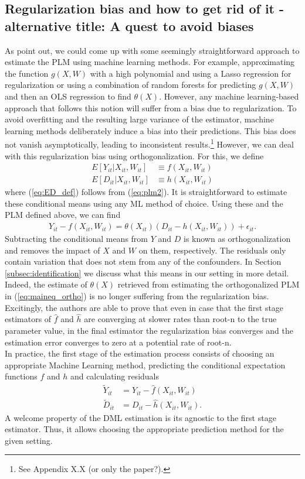 \subsection{Regularization bias and how to get rid of it - alternative title: A quest to avoid biases}
As \cite{DML2017} point out, we could come up with some seemingly straightforward approach to estimate the PLM using machine learning methods. For example, approximating the function $g(X, W)$ with a high polynomial and using a Lasso regression for regularization or using a combination of random forests for predicting $g(X, W)$ and then an OLS regression to find $\theta(X)$. However, any machine learning-based approach that follows this notion will suffer from a bias due to regularization. To avoid overfitting and the resulting large variance of the estimator, machine learning methods deliberately induce a bias into their predictions. This bias does not vanish asymptotically, leading to inconsistent results.\footnote{See Appendix X.X (or only the paper?).} However, we can deal with this regularization bias using orthogonalization. For this, we define 
\begin{align}
    E[Y_{it}|X_{it}, W_{it}] &\equiv f(X_{it}, W_{it}) \label{eq:EY_def}\\ 
    E[D_{it}|X_{it}, W_{it}] &\equiv h(X_{it}, W_{it}) \label{eq:ED_def}
\end{align}
where (\ref{eq:ED_def}) follows from (\ref{eq:plm2}). It is straightforward to estimate these conditional means using any ML method of choice. Using these and the PLM defined above, we can find 
\begin{align}
    Y_{it}-f(X_{it}, W_{it})=\theta(X_{it})(D_{it}-h(X_{it}, W_{it})) + \epsilon_{it}. \label{eq:maineq_ortho}
\end{align}
Subtracting the conditional means from $Y$ and $D$ is known as orthogonalization and removes the impact of $X$ and $W$ on them, respectively. The residuals only contain variation that does not stem from any of the confounders. In Section \ref{subsec:identification} we discuss what this means in our setting in more detail. Indeed, the estimate of $\theta(X)$ retrieved from  estimating the orthogonalized PLM in (\ref{eq:maineq_ortho}) is no longer suffering from the regularization bias. Excitingly, the authors are able to prove that even in case that the first stage estimators of $\hat{f}$ and $\hat{h}$ are converging at slower rates than root-n to the true parameter value, in the final estimator the regularization bias converges and the estimation error converges to zero at a potential rate of root-n. \\
In practice, the first stage of the estimation process consists of choosing an appropriate Machine Learning method, predicting the conditional expectation functions $f$ and $h$ and calculating residuals 
\begin{align*} 
    \tilde{Y}_{it}&=Y_{it}-\hat{f}(X_{it}, W_{it}) \\ 
    \tilde{D}_{it}&=D_{it}-\hat{h}(X_{it}, W_{it}).
\end{align*}
A welcome property of the DML estimation is its agnostic to the first stage estimator. Thus, it allows choosing the appropriate prediction method for the given setting. 

